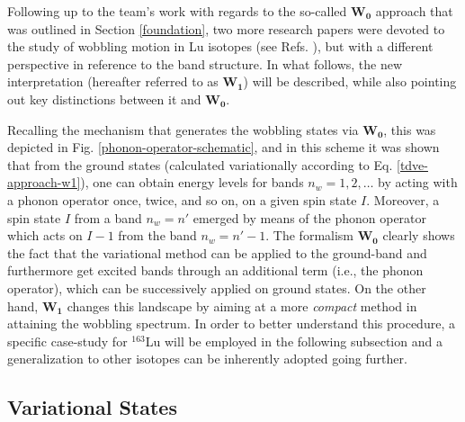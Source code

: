 Following up to the team's work with regards to the so-called $\mathbf{W_0}$ approach that was outlined in Section \ref{foundation}, two more research papers were devoted to the study of wobbling motion in Lu isotopes (see Refs. \cite{raduta2020approach,raduta2020towards}), but with a different perspective in reference to the band structure. In what follows, the new interpretation (hereafter referred to as $\mathbf{W_1}$) will be described, while also pointing out key distinctions between it and $\mathbf{W_0}$.

Recalling the mechanism that generates the wobbling states via $\mathbf{W_0}$, this was depicted in Fig. \ref{phonon-operator-schematic}, and in this scheme it was shown that from the ground states (calculated variationally according to Eq. \ref{tdve-approach-w1}), one can obtain energy levels for bands $n_w=1, 2, \dots$ by acting with a phonon operator once, twice, and so on, on a given spin state $I$. Moreover, a spin state $I$ from a band $n_w=n'$ emerged by means of the phonon operator which acts on $I-1$ from the band $n_w=n'-1$. The formalism $\mathbf{W_0}$ clearly shows the fact that the variational method can be applied to the ground-band and furthermore get excited bands through an additional term (i.e., the phonon operator), which can be successively applied on ground states. On the other hand, $\mathbf{W_1}$ changes this landscape by aiming at a more \emph{compact} method in attaining the wobbling spectrum. In order to better understand this procedure, a specific case-study for $^{163}$Lu will be employed in the following subsection and a generalization to other isotopes can be inherently adopted going further.

\subsection{Variational States}
\label{subsection-variational-states}


